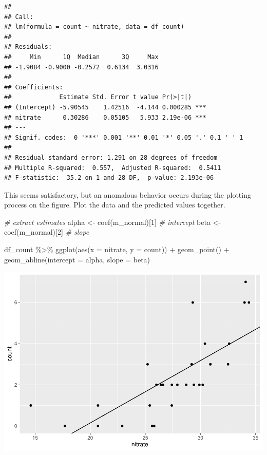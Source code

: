 \documentclass[
]{article}
\newenvironment{Shaded}{\begin{snugshade}}{\end{snugshade}}
\newcommand{\AttributeTok}[1]{\textcolor[rgb]{0.77,0.63,0.00}{#1}}
\newcommand{\CommentTok}[1]{\textcolor[rgb]{0.56,0.35,0.01}{\textit{#1}}}
\newcommand{\DecValTok}[1]{\textcolor[rgb]{0.00,0.00,0.81}{#1}}
\newcommand{\FunctionTok}[1]{\textcolor[rgb]{0.00,0.00,0.00}{#1}}
\newcommand{\NormalTok}[1]{#1}
\newcommand{\OtherTok}[1]{\textcolor[rgb]{0.56,0.35,0.01}{#1}}
\newcommand{\SpecialCharTok}[1]{\textcolor[rgb]{0.00,0.00,0.00}{#1}}
\begin{document}
\begin{verbatim}
## 
## Call:
## lm(formula = count ~ nitrate, data = df_count)
## 
## Residuals:
##     Min      1Q  Median      3Q     Max 
## -1.9084 -0.9000 -0.2572  0.6134  3.0316 
## 
## Coefficients:
##             Estimate Std. Error t value Pr(>|t|)    
## (Intercept) -5.90545    1.42516  -4.144 0.000285 ***
## nitrate      0.30286    0.05105   5.933 2.19e-06 ***
## ---
## Signif. codes:  0 '***' 0.001 '**' 0.01 '*' 0.05 '.' 0.1 ' ' 1
## 
## Residual standard error: 1.291 on 28 degrees of freedom
## Multiple R-squared:  0.557,  Adjusted R-squared:  0.5411 
## F-statistic:  35.2 on 1 and 28 DF,  p-value: 2.193e-06
\end{verbatim}

This seems satisfactory, but an anomalous behavior occurs during the plotting process on the figure. Plot the data and the predicted values together.

\begin{Shaded}
\begin{Highlighting}[]
\CommentTok{\# extract estimates}
\NormalTok{alpha }\OtherTok{\textless{}{-}} \FunctionTok{coef}\NormalTok{(m\_normal)[}\DecValTok{1}\NormalTok{] }\CommentTok{\# intercept}
\NormalTok{beta }\OtherTok{\textless{}{-}} \FunctionTok{coef}\NormalTok{(m\_normal)[}\DecValTok{2}\NormalTok{] }\CommentTok{\# slope}

\NormalTok{df\_count }\SpecialCharTok{\%\textgreater{}\%} 
  \FunctionTok{ggplot}\NormalTok{(}\FunctionTok{aes}\NormalTok{(}\AttributeTok{x =}\NormalTok{ nitrate,}
             \AttributeTok{y =}\NormalTok{ count)) }\SpecialCharTok{+}
  \FunctionTok{geom\_point}\NormalTok{() }\SpecialCharTok{+}
  \FunctionTok{geom\_abline}\NormalTok{(}\AttributeTok{intercept =}\NormalTok{ alpha,}
              \AttributeTok{slope =}\NormalTok{ beta)}
\end{Highlighting}
\end{Shaded}

\begin{center}\includegraphics{biostats_files/figure-latex/unnamed-chunk-59-1} \end{center}
\end{document}
